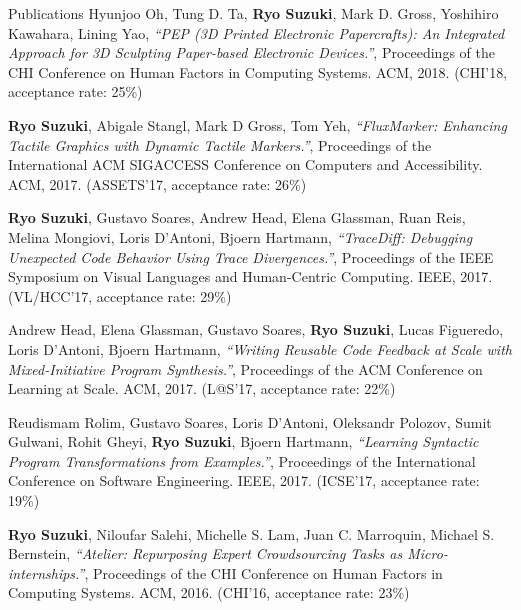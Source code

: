 \documentclass{resume} %
\begin{document}
\begin{rSection}{Publications}
Hyunjoo Oh, Tung D. Ta, {\bf Ryo Suzuki}, Mark D. Gross, Yoshihiro Kawahara, Lining Yao,
{\it ``PEP (3D Printed Electronic Papercrafts): An Integrated Approach for 3D Sculpting Paper-based Electronic Devices.''},
Proceedings of the CHI Conference on Human Factors in Computing Systems. ACM, 2018.
(CHI'18, acceptance rate: 25\%)

{\bf Ryo Suzuki}, Abigale Stangl, Mark D Gross, Tom Yeh,
{\it ``FluxMarker: Enhancing Tactile Graphics with Dynamic Tactile Markers.''},
Proceedings of the International ACM SIGACCESS Conference on Computers and Accessibility. ACM, 2017.
(ASSETS'17, acceptance rate: 26\%)

{\bf Ryo Suzuki}, Gustavo Soares, Andrew Head, Elena Glassman, Ruan Reis, Melina Mongiovi, Loris D'Antoni, Bjoern Hartmann,
{\it ``TraceDiff: Debugging Unexpected Code Behavior Using Trace Divergences.''},
Proceedings of the IEEE Symposium on Visual Languages and Human-Centric Computing. IEEE, 2017.
(VL/HCC'17, acceptance rate: 29\%)

Andrew Head, Elena Glassman, Gustavo Soares, {\bf Ryo Suzuki}, Lucas Figueredo, Loris D'Antoni, Bjoern Hartmann,
{\it ``Writing Reusable Code Feedback at Scale with Mixed-Initiative Program Synthesis.''},
Proceedings of the ACM Conference on Learning at Scale. ACM, 2017.
(L@S'17, acceptance rate: 22\%)

Reudismam Rolim, Gustavo Soares, Loris D'Antoni, Oleksandr Polozov, Sumit Gulwani, Rohit Gheyi, {\bf Ryo Suzuki}, Bjoern Hartmann,
{\it ``Learning Syntactic Program Transformations from Examples.''},
Proceedings of the International Conference on Software Engineering. IEEE, 2017.
(ICSE'17, acceptance rate: 19\%)

{\bf Ryo Suzuki}, Niloufar Salehi, Michelle S. Lam,
Juan C. Marroquin, Michael S. Bernstein,
{\it ``Atelier: Repurposing Expert Crowdsourcing Tasks as Micro-internships.''},
Proceedings of the CHI Conference on Human Factors in Computing Systems. ACM, 2016.
(CHI'16, acceptance rate: 23\%)

\end{rSection}



\end{document}
